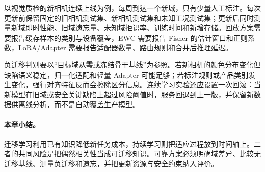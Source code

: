 以视觉质检的新相机连续上线为例，每周到达一个新域，只有少量人工标注。每次更新前保留固定的旧相机测试集、新相机测试集和未知工况测试集；更新后同时测量新域即时性能、旧域遗忘量、未知域拒识率、训练时间和新增存储。回放方案需要报告缓存样本的类别与设备覆盖，EWC 需要报告 Fisher 的估计窗口和正则系数，LoRA/Adapter 需要报告适配器数量、路由规则和合并后推理延迟。

负迁移判别要以“目标域从零或冻结骨干基线”为参照。若新相机的颜色分布变化但缺陷语义稳定，归一化适配和轻量 Adapter 可能足够；若标注规则或产品类别发生变化，强行对齐特征反而会擦除区分信息。连续学习实验还应设置一次回滚：当新模型在旧域或安全关键缺陷上超过风险阈值时，服务回退到上一版，并保留新数据供离线分析，而不是自动覆盖生产模型。

\paragraph{本章小结。}
迁移学习利用已有知识降低新任务成本，持续学习则把适应过程放到时间轴上。二者的共同风险是把偶然相关性当成可迁移知识。可靠方案必须明确域差异、比较无迁移基线、测量负迁移和遗忘，并把更新资源与安全约束纳入评价。